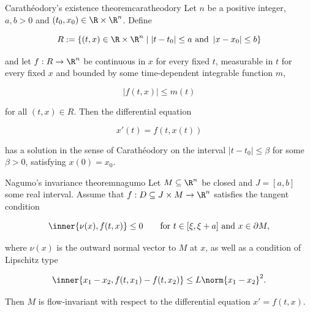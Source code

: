 \begin{theorem}{Carath\'eodory's existence theorem}{caratheodory}
    Let $n$ be a positive integer, $a, b > 0$ and $(t_0, x_0) \in \R \times \R^n$. Define

    \begin{equation*}
        R := \{ (t, x) \in \R \times \R^n \mid |t - t_0| \leq a \text{ and } \left|x - x_0\right| \leq b \}
    \end{equation*}

    and let $f: R \to \R^n$ be continuous in $x$ for every fixed $t$, measurable in $t$ for every fixed $x$ and bounded by some time-dependent integrable function $m$,
    
    \begin{equation*}
        \left|f(t, x)\right| \leq m(t)
    \end{equation*}

    for all $(t, x) \in R$. Then the differential equation

    \begin{equation*}
        x'(t) = f(t, x(t))
    \end{equation*}

    has a solution in the sense of Carath\'eodory on the interval $|t - t_0| \leq \beta$ for some $\beta > 0$, satisfying $x(0) = x_0$.
\end{theorem}

\begin{theorem}{Nagumo's invariance theorem}{nagumo}
    Let $M \subseteq \R^n$ be closed and $J = [a, b]$ some real interval. Assume that $f: D \subseteq J \times M \to \R^n$ satisfies the tangent condition

    \begin{equation*}
        \inner{\nu(x), f(t, x)} \leq 0 \qquad \text{for } t \in [\xi, \xi + a] \text{ and } x \in \partial M,
    \end{equation*}

    \noindent
    where $\nu(x)$ is the outward normal vector to $M$ at $x$, as well as a condition of Lipschitz type
    
    \begin{equation*}
        \inner{x_1 - x_2, f(t, x_1) - f(t, x_2)} \leq L \norm{x_1 - x_2}^2.
    \end{equation*}

    \noindent
    Then $M$ is flow-invariant with respect to the differential equation $x' = f(t, x)$.
\end{theorem}
